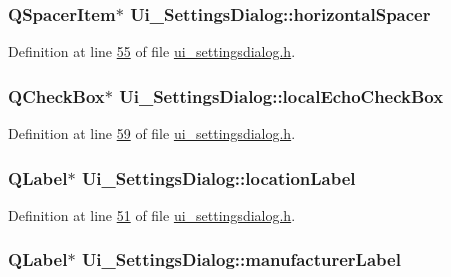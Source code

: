 \hypertarget{a00082_a91941a5010b87cc8a0c26a641d4a7808}{
\subsubsection[{horizontal\+Spacer}]{\setlength{\rightskip}{0pt plus 5cm}Q\+Spacer\+Item$\ast$ Ui\+\_\+\+Settings\+Dialog\+::horizontal\+Spacer}}\label{a00082_a91941a5010b87cc8a0c26a641d4a7808}


Definition at line \hyperlink{a00141_source_l00055}{55} of file \hyperlink{a00141_source}{ui\+\_\+settingsdialog.\+h}.

\hypertarget{a00082_a4cef19b8232e266ba202152ade600263}{
\subsubsection[{local\+Echo\+Check\+Box}]{\setlength{\rightskip}{0pt plus 5cm}Q\+Check\+Box$\ast$ Ui\+\_\+\+Settings\+Dialog\+::local\+Echo\+Check\+Box}}\label{a00082_a4cef19b8232e266ba202152ade600263}


Definition at line \hyperlink{a00141_source_l00059}{59} of file \hyperlink{a00141_source}{ui\+\_\+settingsdialog.\+h}.

\hypertarget{a00082_ad860892f11a79cb726643d3478078fcd}{
\subsubsection[{location\+Label}]{\setlength{\rightskip}{0pt plus 5cm}Q\+Label$\ast$ Ui\+\_\+\+Settings\+Dialog\+::location\+Label}}\label{a00082_ad860892f11a79cb726643d3478078fcd}


Definition at line \hyperlink{a00141_source_l00051}{51} of file \hyperlink{a00141_source}{ui\+\_\+settingsdialog.\+h}.

\hypertarget{a00082_afeadc7657c9eaa3103bd529342f5fe97}{
\subsubsection[{manufacturer\+Label}]{\setlength{\rightskip}{0pt plus 5cm}Q\+Label$\ast$ Ui\+\_\+\+Settings\+Dialog\+::manufacturer\+Label}}\label{a00082_afeadc7657c9eaa3103bd529342f5fe97}


